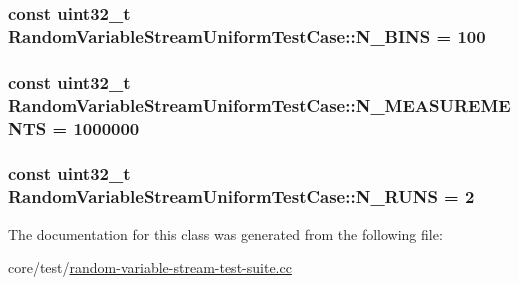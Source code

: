 \subsubsection[{\texorpdfstring{N\+\_\+\+B\+I\+NS}{N_BINS}}]{\setlength{\rightskip}{0pt plus 5cm}const uint32\+\_\+t Random\+Variable\+Stream\+Uniform\+Test\+Case\+::\+N\+\_\+\+B\+I\+NS = 100\hspace{0.3cm}{\ttfamily [static]}}\hypertarget{classRandomVariableStreamUniformTestCase_ab9bd5ab207c7358f8425b7b4ca516c42}{}\label{classRandomVariableStreamUniformTestCase_ab9bd5ab207c7358f8425b7b4ca516c42}
\subsubsection[{\texorpdfstring{N\+\_\+\+M\+E\+A\+S\+U\+R\+E\+M\+E\+N\+TS}{N_MEASUREMENTS}}]{\setlength{\rightskip}{0pt plus 5cm}const uint32\+\_\+t Random\+Variable\+Stream\+Uniform\+Test\+Case\+::\+N\+\_\+\+M\+E\+A\+S\+U\+R\+E\+M\+E\+N\+TS = 1000000\hspace{0.3cm}{\ttfamily [static]}}\hypertarget{classRandomVariableStreamUniformTestCase_af698d1758a3c70dda2001f1b6d5b87b1}{}\label{classRandomVariableStreamUniformTestCase_af698d1758a3c70dda2001f1b6d5b87b1}
\subsubsection[{\texorpdfstring{N\+\_\+\+R\+U\+NS}{N_RUNS}}]{\setlength{\rightskip}{0pt plus 5cm}const uint32\+\_\+t Random\+Variable\+Stream\+Uniform\+Test\+Case\+::\+N\+\_\+\+R\+U\+NS = 2\hspace{0.3cm}{\ttfamily [static]}}\hypertarget{classRandomVariableStreamUniformTestCase_a12d6e3ab344655b6af2b31b5dcc043af}{}\label{classRandomVariableStreamUniformTestCase_a12d6e3ab344655b6af2b31b5dcc043af}


The documentation for this class was generated from the following file\+:\begin{DoxyCompactItemize}
\item 
core/test/\hyperlink{random-variable-stream-test-suite_8cc}{random-\/variable-\/stream-\/test-\/suite.\+cc}\end{DoxyCompactItemize}
